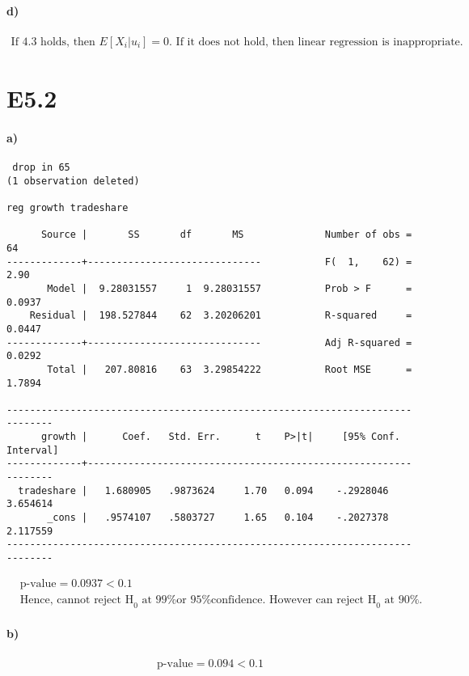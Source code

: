 \documentclass[letterpaper,12pt,titlepage,oneside,final]{book}
\begin{document}
\paragraph{d)}
\begin{align*}
\text{If 4.3 holds, then } E[X_i | u_i] = 0. \text{ If it does not hold, then linear regression is inappropriate.}
\end{align*}

\section*{E5.2}
\paragraph{a)}
\begin{verbatim}
 drop in 65
(1 observation deleted)

reg growth tradeshare

      Source |       SS       df       MS              Number of obs =      64
-------------+------------------------------           F(  1,    62) =    2.90
       Model |  9.28031557     1  9.28031557           Prob > F      =  0.0937
    Residual |  198.527844    62  3.20206201           R-squared     =  0.0447
-------------+------------------------------           Adj R-squared =  0.0292
       Total |   207.80816    63  3.29854222           Root MSE      =  1.7894

------------------------------------------------------------------------------
      growth |      Coef.   Std. Err.      t    P>|t|     [95% Conf. Interval]
-------------+----------------------------------------------------------------
  tradeshare |   1.680905   .9873624     1.70   0.094    -.2928046    3.654614
       _cons |   .9574107   .5803727     1.65   0.104    -.2027378    2.117559
------------------------------------------------------------------------------
\end{verbatim}
\begin{align*}
&\text{p-value} =  0.0937 < 0.1 \\
&\text{Hence, cannot reject H}_0 \text{ at 99\% or 95\% confidence. However can reject H}_0 \text{ at 90\%.}
\end{align*}

\paragraph{b)}
\begin{align*}
\text{p-value} = 0.094 < 0.1
\end{align*}
\end{document}
